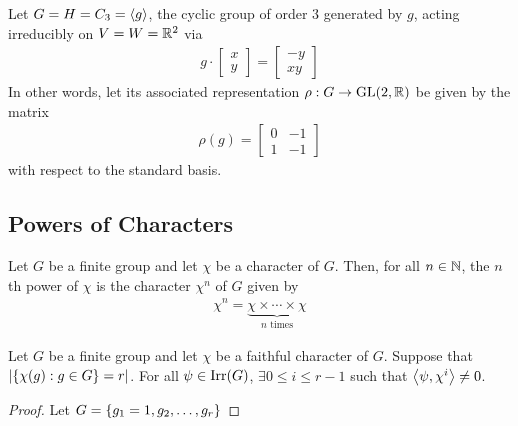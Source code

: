 \begin{boxexample}
    Let $G = H = C_3 = \left\langle g \right\rangle$, the cyclic group of order $3$ generated by $g$, acting irreducibly on $V = W = \mathbb{R}^2$ via
    \begin{align*}
        g \cdot \begin{bmatrix} x \\ y \end{bmatrix} = \begin{bmatrix} -y \\ xy \end{bmatrix}
    \end{align*}
    In other words, let its associated representation $\rho : G \to \operatorname{GL}\!\left( 2, \mathbb{R} \right)$ be given by the matrix
    \begin{align*}
        \rho(g) = \begin{bmatrix} 0 & -1 \\ 1 & -1 \end{bmatrix}
    \end{align*}
    with respect to the standard basis. 
\end{boxexample}

\subsection{Powers of Characters}

\begin{boxnotation}
    Let $G$ be a finite group and let $\chi$ be a character of $G$. Then, for all $n \in \mathbb{N}$, the $n$th power of $\chi$ is the character $\chi^n$ of $G$ given by
    \begin{align*}
        \chi^n = \underbrace{\chi \times \cdots \times \chi}_{n \text{ times}}
    \end{align*}
\end{boxnotation}

\begin{theorem}
    Let $G$ be a finite group and let $\chi$ be a faithful character of $G$. Suppose that $\left\lvert \left\{ \chi(g) : g \in G \right\} = r \right\rvert$. For all $\psi \in \operatorname{Irr}\!\left( G \right)$, $\exists 0 \leq i \leq r - 1$ such that $\left\langle \psi, \chi^i \right\rangle \neq 0$.
\end{theorem}
\begin{proof}
    Let $G = \left\{ g_1 = 1, g_2, \ldots, g_r \right\}$
\end{proof}
